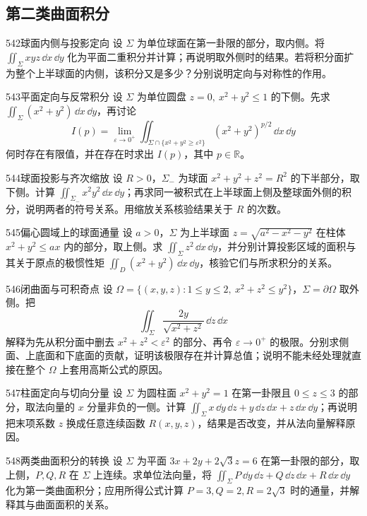 \subsection{第二类曲面积分}
\begin{exercise}{542}{球面内侧与投影定向}
设 $\Sigma$ 为单位球面在第一卦限的部分，取内侧。将 $\iint_{\Sigma}xyz\,\dd x\,\dd y$ 化为平面二重积分并计算；再说明取外侧时的结果。若将积分面扩为整个上半球面的内侧，该积分又是多少？分别说明定向与对称性的作用。
\end{exercise}
\begin{exercise}{543}{平面定向与反常积分}
设 $\Sigma$ 为单位圆盘 $z=0,\ x^2+y^2\le1$ 的下侧。先求 $\iint_{\Sigma}(x^2+y^2)\,\dd x\,\dd y$，再讨论
\[I(p)=\lim_{\varepsilon\to0^+}\iint_{\Sigma\cap\{x^2+y^2\ge\varepsilon^2\}}(x^2+y^2)^{p/2}\,\dd x\,\dd y\]
何时存在有限值，并在存在时求出 $I(p)$，其中 $p\in\mathbb R$。
\end{exercise}
\begin{exercise}{544}{球面投影与齐次缩放}
设 $R>0$，$\Sigma_-$ 为球面 $x^2+y^2+z^2=R^2$ 的下半部分，取下侧。计算 $\iint_{\Sigma_-}x^2y^2\,\dd x\,\dd y$；再求同一被积式在上半球面上侧及整球面外侧的积分，说明两者的符号关系。用缩放关系核验结果关于 $R$ 的次数。
\end{exercise}
\begin{exercise}{545}{偏心圆域上的球面通量}
设 $a>0$，$\Sigma$ 为上半球面 $z=\sqrt{a^2-x^2-y^2}$ 在柱体 $x^2+y^2\le ax$ 内的部分，取上侧。求 $\iint_{\Sigma}z^2\,\dd x\,\dd y$，并分别计算投影区域的面积与其关于原点的极惯性矩 $\iint_D(x^2+y^2)\,\dd x\,\dd y$，核验它们与所求积分的关系。
\end{exercise}
\begin{exercise}{546}{闭曲面与可积奇点}
设 $\Omega=\{(x,y,z):1\le y\le2,\ x^2+z^2\le y^2\}$，$\Sigma=\partial\Omega$ 取外侧。把
\[\iint_{\Sigma}\frac{2y}{\sqrt{x^2+z^2}}\,\dd z\,\dd x\]
解释为先从积分面中删去 $x^2+z^2<\varepsilon^2$ 的部分、再令 $\varepsilon\to0^+$ 的极限。分别求侧面、上底面和下底面的贡献，证明该极限存在并计算总值；说明不能未经处理就直接在整个 $\Omega$ 上套用高斯公式的原因。
\end{exercise}
\begin{exercise}{547}{柱面定向与切向分量}
设 $\Sigma$ 为圆柱面 $x^2+y^2=1$ 在第一卦限且 $0\le z\le3$ 的部分，取法向量的 $x$ 分量非负的一侧。计算 $\iint_{\Sigma}x\,\dd y\,\dd z+y\,\dd z\,\dd x+z\,\dd x\,\dd y$；再说明把末项系数 $z$ 换成任意连续函数 $R(x,y,z)$，结果是否改变，并从法向量解释原因。
\end{exercise}
\begin{exercise}{548}{两类曲面积分的转换}
设 $\Sigma$ 为平面 $3x+2y+2\sqrt3z=6$ 在第一卦限的部分，取上侧，$P,Q,R$ 在 $\Sigma$ 上连续。求单位法向量，将 $\iint_{\Sigma}P\,\dd y\,\dd z+Q\,\dd z\,\dd x+R\,\dd x\,\dd y$ 化为第一类曲面积分；应用所得公式计算 $P=3,Q=2,R=2\sqrt3$ 时的通量，并解释其与曲面面积的关系。
\end{exercise}

